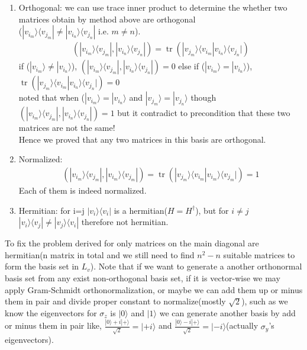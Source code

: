 \begin{enumerate}
    \item Orthogonal: we can use trace inner product to determine the whether two matrices obtain by method above are orthogonal \\
    ($|v_i_m\rangle\langle v_j_m|\neq |v_i_n\rangle\langle v_j_n|$ i.e. $m \neq n$).
    \begin{equation}
    \begin{split}
        (|v_i_m\rangle\langle v_j_m|,|v_i_n\rangle\langle v_j_n|) = \operatorname{tr}(|v_j_m\rangle\langle v_i_m|v_i_n\rangle\langle v_j_n|)
    \end{split}
    \end{equation}
    if ($|v_i_m\rangle \neq|v_i_n\rangle $), $(|v_i_m\rangle\langle v_j_m|,|v_i_n\rangle\langle v_j_n|) =0$
    else if ($|v_i_m\rangle =|v_i_n\rangle $), 
    $\operatorname{tr}(|v_j_m\rangle\langle v_i_m|v_i_n\rangle\langle v_j_n|) =0$\\
    noted that when ($|v_i_m\rangle =|v_i_n\rangle$ and $|v_j_m\rangle =|v_j_n\rangle$ though\\
    $(|v_i_m\rangle\langle v_j_m|,|v_i_n\rangle\langle v_j_n|) = 1$ but it contradict to precondition that these two matrices are not the same!\\
    Hence we proved that any two matrices in this basis are orthogonal.
    \item Normalized: 
    \begin{equation}
    \begin{split}
        (|v_i_m\rangle\langle v_j_m|,|v_i_m\rangle\langle v_j_m|) = \operatorname{tr}(|v_j_m\rangle\langle v_i_m|v_i_m\rangle\langle v_j_m|) = 1
    \end{split}
    \end{equation}
    Each of them is indeed normalized.
    \item Hermitian: for i=j $|v_i\rangle\langle v_i|$ is a hermitian($H = H^{\dag}$), but for $i\neq j$ $|v_i\rangle\langle v_j| \neq |v_j\rangle\langle v_i|$ therefore not hermitian.
\end{enumerate}
To fix the problem derived for only matrices on the main diagonal are hermitian(n matrix in total and we still need to find $n^2-n$ suitable matrices to form the basis set in $L_v$). Note that if we want to generate a another orthonormal basis set from any exist non-orthogonal basis set, if it is vector-wise we may apply Gram-Schmidt orthonormalization, or maybe we can add them up or minus them in pair and divide proper constant to normalize(mostly $\sqrt{2}$), such as we know the eigenvectors for $\sigma_z$ is $|0\rangle$ and $|1\rangle$ we can generate another basis by add or minus them in pair like, $\frac{|0\rangle + i|+\rangle}{\sqrt{2}} = |+i\rangle$ and $\frac{|0\rangle - i|+\rangle}{\sqrt{2} }= |-i\rangle$(actually $\sigma_y$'s eigenvectors).\\
